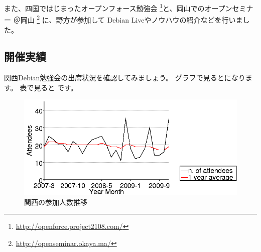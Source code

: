 \documentclass[mingoth,a4paper]{jsarticle}
\begin{document}
また、四国ではじまったオープンフォース勉強会 \footnote{
\url{http://openforce.project2108.com/}}と、岡山でのオープンセミナー
＠岡山 \footnote{\url{http://openseminar.okaya.ma/}} に、野方が参加して
Debian Liveやノウハウの紹介などを行いました。

\subsection{開催実績}

関西Debian勉強会の出席状況を確認してみましょう。
グラフで見るとになります。
表で見ると です。

\begin{figure}[h]
 \begin{center}
  \includegraphics[width=1\hsize]{image200912/kansai.png}
 \end{center}
\caption{関西の参加人数推移}
\label{fig:kansaipeoplechart}
\end{figure}
\end{document}
